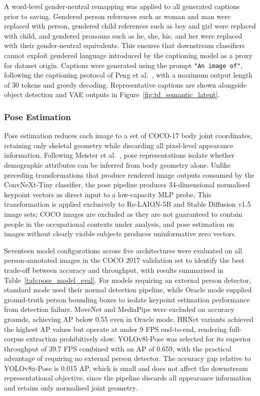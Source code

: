 A word-level gender-neutral remapping was applied to all generated captions prior to saving. Gendered person references such as woman and man were replaced with person, gendered child references such as boy and girl were replaced with child, and gendered pronouns such as he, she, his, and her were replaced with their gender-neutral equivalents. This ensures that downstream classifiers cannot exploit gendered language introduced by the captioning model as a proxy for dataset origin. Captions were generated using the prompt \texttt{"An image of"}, following the captioning protocol of Peng et al.\ \cite{Peng_2023_Kosmos2}, with a maximum output length of 30 tokens and greedy decoding. Representative captions are shown alongside object detection and VAE outputs in Figure~\ref{fig:td_semantic_latent}.

\subsubsection{Pose Estimation}
\label{subsec:pose}

Pose estimation reduces each image to a set of COCO-17 body joint coordinates, retaining only skeletal geometry while discarding all pixel-level appearance information. Following Meister et al.\ \cite{Meister_2023_GenderArtifactsinVisualDatasets}, pose representations isolate whether demographic attributes can be inferred from body geometry alone. Unlike preceding transformations that produce rendered image outputs consumed by the ConvNeXt-Tiny classifier, the pose pipeline produces 34-dimensional normalised keypoint vectors as direct input to a low-capacity MLP probe. This transformation is applied exclusively to Re-LAION-5B and Stable Diffusion v1.5 image sets; COCO images are excluded as they are not guaranteed to contain people in the occupational contexts under analysis, and pose estimation on images without clearly visible subjects produces uninformative zero vectors.

Seventeen model configurations across five architectures were evaluated on all person-annotated images in the COCO 2017 validation set to identify the best trade-off between accuracy and throughput, with results summarised in Table~\ref{tab:pose_model_eval}. For models requiring an external person detector, standard mode used their normal detection pipeline, while Oracle mode supplied ground-truth person bounding boxes to isolate keypoint estimation performance from detection failure. MoveNet and MediaPipe were excluded on accuracy grounds, achieving AP below 0.55 even in Oracle mode. HRNet variants achieved the highest AP values but operate at under 9 FPS end-to-end, rendering full-corpus extraction prohibitively slow. YOLOv8l-Pose was selected for its superior throughput of 39.7 FPS combined with an AP of 0.659, with the practical advantage of requiring no external person detector. The accuracy gap relative to YOLOv8x-Pose is 0.015 AP, which is small and does not affect the downstream representational objective, since the pipeline discards all appearance information and retains only normalised joint geometry.

